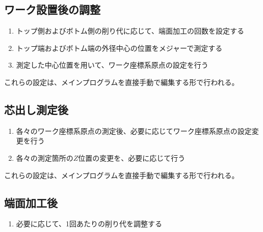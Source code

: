 \subsection{ワーク設置後の調整}
\begin{enumerate}
\item トップ側およびボトム側の削り代に応じて、端面加工の回数を設定する
\item トップ端およびボトム端の外径中心の位置をメジャーで測定する
\item 測定した中心位置を用いて、ワーク座標系原点の設定を行う
\end{enumerate}
これらの設定は、メインプログラムを直接手動で編集する形で行われる。



\clearpage


\subsection{芯出し測定後}
\begin{enumerate}
\item 各々のワーク座標系原点の測定後、必要に応じてワーク座標系原点の設定変更を行う
\item 各々の測定箇所の$Z$位置の変更を、必要に応じて行う
\end{enumerate}
これらの設定は、メインプログラムを直接手動で編集する形で行われる。


\subsection{端面加工後}
\begin{enumerate}
\item 必要に応じて、1回あたりの削り代を調整する
\end{enumerate}


